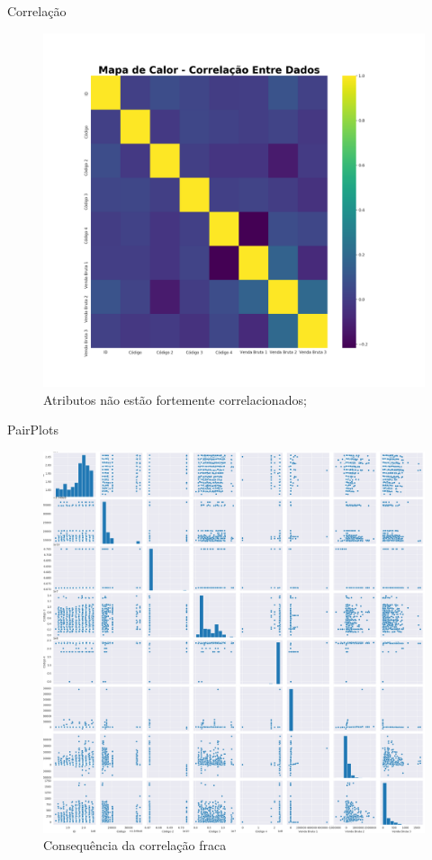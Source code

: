 \documentclass[compress]{beamer}
\begin{document}
\begin{frame}{Correlação}
    \begin{figure}[h!]
        \centering
        \includegraphics[scale=.25]{img/heatmap.png}
        \caption{Atributos não estão fortemente correlacionados;}
        \label{fig:corr}
    \end{figure}
\end{frame}
\begin{frame}{PairPlots}
    \begin{figure}[h!]
        \centering
        \includegraphics[scale=.16]{img/pair.png}
        \caption{Consequência da correlação fraca}
        \label{fig:pair1}
    \end{figure}
\end{frame}
\end{document}
